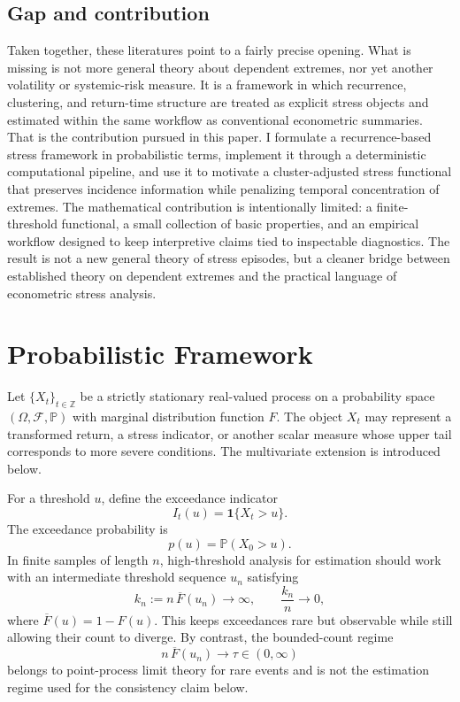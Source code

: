 \documentclass[11pt]{article}
\begin{document}
\subsection{Gap and contribution}

Taken together, these literatures point to a fairly precise opening. What is missing is not more general theory about dependent extremes, nor yet another volatility or systemic-risk measure. It is a framework in which recurrence, clustering, and return-time structure are treated as explicit stress objects and estimated within the same workflow as conventional econometric summaries. That is the contribution pursued in this paper. I formulate a recurrence-based stress framework in probabilistic terms, implement it through a deterministic computational pipeline, and use it to motivate a cluster-adjusted stress functional that preserves incidence information while penalizing temporal concentration of extremes. The mathematical contribution is intentionally limited: a finite-threshold functional, a small collection of basic properties, and an empirical workflow designed to keep interpretive claims tied to inspectable diagnostics. The result is not a new general theory of stress episodes, but a cleaner bridge between established theory on dependent extremes and the practical language of econometric stress analysis.

\section{Probabilistic Framework}

Let $\{X_t\}_{t \in \mathbb{Z}}$ be a strictly stationary real-valued process on a probability space $(\Omega,\mathcal{F},\mathbb{P})$ with marginal distribution function $F$. The object $X_t$ may represent a transformed return, a stress indicator, or another scalar measure whose upper tail corresponds to more severe conditions. The multivariate extension is introduced below.

For a threshold $u$, define the exceedance indicator
\[
I_t(u)=\mathbf{1}\{X_t>u\}.
\]
The exceedance probability is
\[
p(u)=\mathbb{P}(X_0>u).
\]
In finite samples of length $n$, high-threshold analysis for estimation should work with an intermediate threshold sequence $u_n$ satisfying
\[
k_n:=n\,\overline{F}(u_n)\to \infty,
\qquad
\frac{k_n}{n}\to 0,
\]
where $\overline{F}(u)=1-F(u)$. This keeps exceedances rare but observable while still allowing their count to diverge. By contrast, the bounded-count regime
\[
n\,\overline{F}(u_n)\to \tau \in (0,\infty)
\]
belongs to point-process limit theory for rare events and is not the estimation regime used for the consistency claim below.
\end{document}
